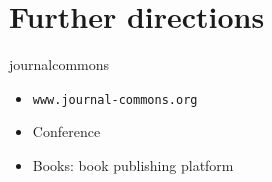 \section{Further directions}
\begin{frame}{journalcommons}{}
 
\begin{itemize}
 \item {\tt www.journal-commons.org}
 \item Conference
 \item Books: book publishing platform
\end{itemize}
 
\end{frame}
